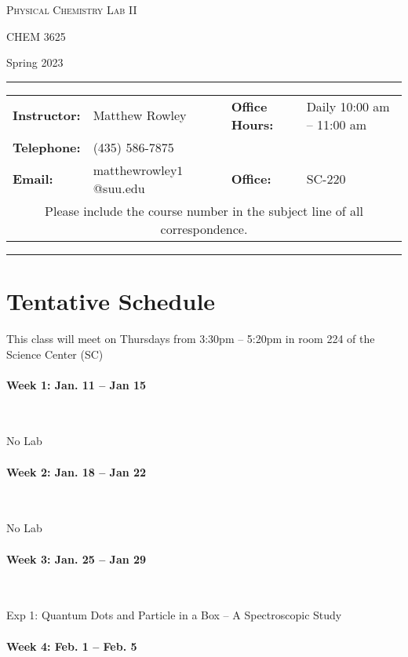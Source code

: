 \documentclass[12pt, letterpaper]{article}
\begin{document}
\begin{center}
	{\Large \textsc{Physical Chemistry Lab II}}

	CHEM 3625
\end{center}

\begin{center}
	{\large Spring 2023}
\end{center}
\begin{center}
	\rule{0.99\textwidth}{0.4pt}
	\begin{tabular}{llcll}
		\textbf{Instructor:} & Matthew Rowley           &  & \textbf{Office Hours:} & Daily 10:00 am -- 11:00 am \\
		\textbf{Telephone:}  & (435) 586-7875           &  &                        &                            \\
		\textbf{Email:}      & matthewrowley$1$@suu.edu &  & \textbf{Office:}       & SC-220                     \\
		\multicolumn{5}{c}{Please include the course number in the subject line of all correspondence.}
	\end{tabular}
	\rule{0.99\textwidth}{0.4pt}
\end{center}


\section*{Tentative Schedule}
This class will meet on Thursdays from 3:30pm -- 5:20pm in room 224 of the Science Center (SC)

\paragraph*{Week 1: Jan. 11 -- Jan 15}~

No Lab

\paragraph{Week 2: Jan. 18 -- Jan 22}~

No Lab

\paragraph{Week 3:  Jan. 25 -- Jan 29}~

Exp 1: Quantum Dots and Particle in a Box – A Spectroscopic Study

\paragraph{Week 4: Feb. 1 -- Feb. 5}~
\end{document}
